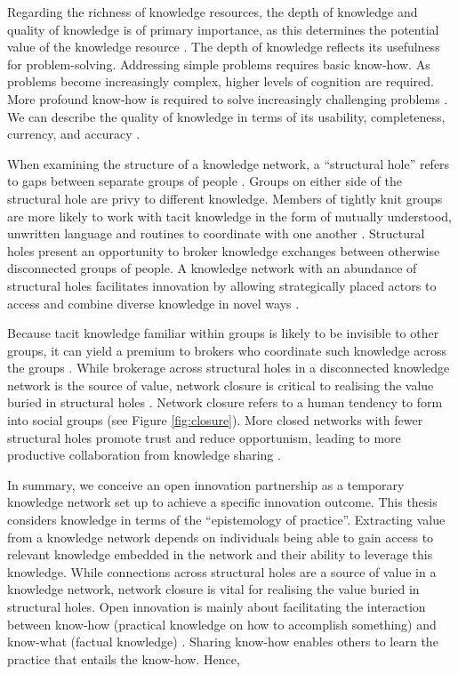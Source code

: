 Regarding the richness of knowledge resources, the depth of knowledge and quality of knowledge is of primary importance, as this determines the potential value of the knowledge resource \citep{davenport1998working,kane2005knowledge}. The depth of knowledge reflects its usefulness for problem-solving. Addressing simple problems requires basic know-how. As problems become increasingly complex, higher levels of cognition are required. More profound know-how is required to solve increasingly challenging problems \citep{webb2002depth,bennet2008depth}. We can describe the quality of knowledge in terms of its usability, completeness, currency, and accuracy \citep{wixom2005theoretical}. \medskip

When examining the structure of a knowledge network, a \enquote{structural hole} refers to gaps between separate groups of people \citep{burt2000network}. Groups on either side of the structural hole are privy to different knowledge. Members of tightly knit groups are more likely to work with tacit knowledge in the form of mutually understood, unwritten language and routines to coordinate with one another \citep{burt2007secondhand}. Structural holes present an opportunity to broker knowledge exchanges between otherwise disconnected groups of people. A knowledge network with an abundance of structural holes facilitates innovation by allowing strategically placed actors to access and combine diverse knowledge in novel ways \citep{burt2004structural,sparrowe2011publishing}. \medskip

Because tacit knowledge familiar within groups is likely to be invisible to other groups, it can yield a premium to brokers who coordinate such knowledge across the groups \citep{burt2007secondhand}. While brokerage across structural holes in a disconnected knowledge network is the source of value, network closure is critical to realising the value buried in structural holes \citep{burt2004structural,rost2011strength}. Network closure refers to a human tendency to form into social groups (see Figure \ref{fig:closure}). More closed networks with fewer structural holes promote trust and reduce opportunism, leading to more productive collaboration from knowledge sharing \citep{ahuja2000collaboration, burt2007secondhand}. \medskip

In summary, we conceive an open innovation partnership as a temporary knowledge network set up to achieve a specific innovation outcome. This thesis considers knowledge in terms of the \enquote{epistemology of practice}. Extracting value from a knowledge network depends on individuals being able to gain access to relevant knowledge embedded in the network and their ability to leverage this knowledge. While connections across structural holes are a source of value in a knowledge network, network closure is vital for realising the value buried in structural holes.  Open innovation is mainly about facilitating the interaction between know-how (practical knowledge on how to accomplish something) and know-what (factual knowledge) \citep{winter1987knowledge,garud1997distinction}. Sharing know-how enables others to learn the practice that entails the know-how. Hence, \bigskip

